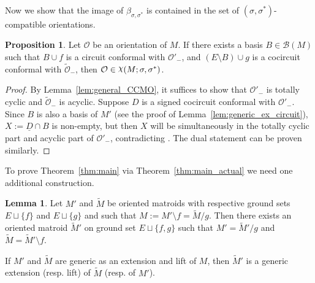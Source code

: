 \documentclass[12pt]{amsart}
\numberwithin{equation}{section}
\theoremstyle{definition}
\newtheorem{lemma}[theorem]{Lemma}
\newtheorem{proposition}[theorem]{Proposition}
\newcommand{\Bcal}{{\mathcal B}}
\newcommand{\Ocal}{{\mathcal O}}
\DeclareRobustCommand{\rchi}{{\mathpalette\irchi\relax}}
\newcommand{\irchi}[2]{\raisebox{\depth}{$#1\chi$}}
\begin{document}
Now we show that the image of $\beta_{\sigma,\sigma^*}$ is contained in the set of $(\sigma,\sigma^*)$-compatible orientations.

\begin{proposition} \label{prop:EL_pos_CCM}
Let $\Ocal$ be an orientation of $M$. If there exists a basis $B\in\Bcal(M)$ such that $B\cup f$ is a circuit conformal with $\Ocal'_-$, and $(E\setminus B)\cup g$ is a cocircuit conformal with $\widetilde{\Ocal}_-$, then $\Ocal\in\rchi(M;\sigma,\sigma^*)$.
\end{proposition}

\begin{proof}
By Lemma~\ref{lem:general_CCMO}, it suffices to show that $\Ocal'_-$ is totally cyclic and $\widetilde{\Ocal}_-$ is acyclic. Suppose $D$ is a signed cocircuit conformal with $\Ocal'_-$. Since $B$ is also a basis of $M'$ (see the proof of Lemma~\ref{lem:generic_ex_circuit}), $X:=\underline{D}\cap B$ is non-empty, but then $X$ will be simultaneously in the totally cyclic part and acyclic part of $\Ocal'_-$, contradicting \cite[Corollary 3.4.6]{BLSWZ_book}. The dual statement can be proven similarly.
\end{proof}

To prove Theorem~\ref{thm:main} via  Theorem~\ref{thm:main_actual} we need one additional construction.

\begin{lemma} \cite[Lemma 1.10]{Santos_book} \label{lem:common_ex_lifting}
Let $M'$ and $\widetilde{M}$ be oriented matroids with respective ground sets $E\sqcup\{f\}$ and $E\sqcup\{g\}$ and such that $M:=M'\setminus f = \widetilde M/g$.
Then there exists an oriented matroid $\widetilde{M}'$ on ground set $E\sqcup\{f,g\}$ such that $M'=\widetilde{M}'/g$ and $\widetilde{M}=\widetilde{M}'\setminus f$.


If $M'$ and $\widetilde{M}$ are generic as an extension and lift of $M$, then $\widetilde M'$ is a generic extension (resp. lift) of $\widetilde M$ (resp. of $M'$).
\end{lemma}
\end{document}
